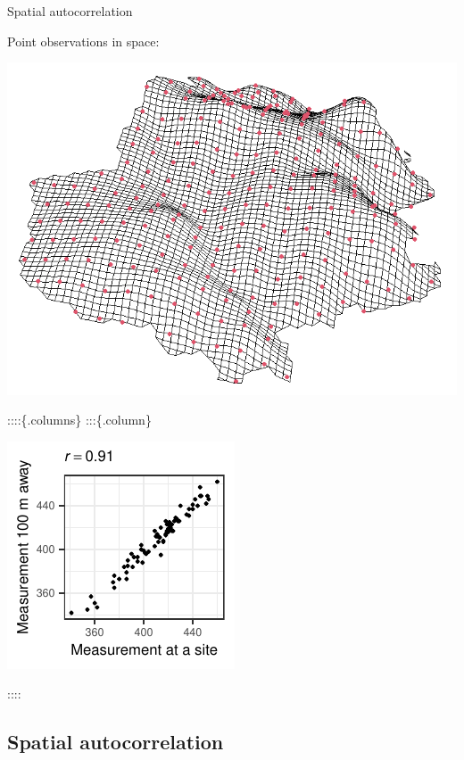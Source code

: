 \documentclass[
  ignorenonframetext,
]{beamer}
\begin{document}
\begin{frame}{Spatial autocorrelation}
\small

Point observations in space:

\includegraphics[width=10.17in,height=0.3\textheight]{terrain2}

::::\{.columns\} :::\{.column\}

\includegraphics{Lecture_1_files/figure-beamer/unnamed-chunk-5-1.pdf}

::::
\end{frame}

\hypertarget{spatial-autocorrelation-1}{%
\subsection{Spatial autocorrelation}\label{spatial-autocorrelation-1}}
\end{document}
